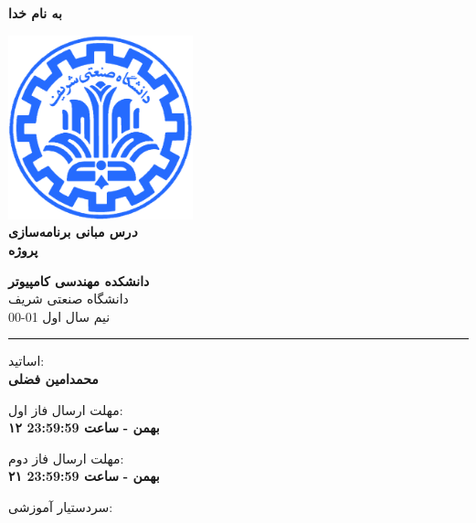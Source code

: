\documentclass[]{article}
\begin{document}
\begin{titlepage}
\begin{center}

\textbf{ \Huge{به نام خدا} }
        
\vspace{0.2cm}

\includegraphics[width=0.4\textwidth]{sharif1.png}\\
\vspace{0.2cm}
\textbf{ \Huge{\emph درس مبانی برنامه‌سازی } }\\
\vspace{0.25cm}
\textbf{ \Large{ پروژه} }
\vspace{0.2cm}
       
 
      \large \textbf{دانشکده مهندسی کامپیوتر}\\\vspace{0.1cm}
    \large   دانشگاه صنعتی شریف\\\vspace{0.2cm}
       \large   ﻧﯿﻢ سال اول 01-00 \\\vspace{0.10cm}
      \noindent\rule[1ex]{\linewidth}{1pt}
اساتید:\\
    \textbf{{محمدامین فضلی }}



    \vspace{0.20cm}

   مهلت ارسال فاز اول:\\
    \textbf{{۱۲ بهمن - }}
    \textbf{{ساعت 23:59:59}}

    \vspace{0.10cm}
    
       مهلت ارسال فاز دوم:\\
    
    \textbf{{۲۱ بهمن - }}
    \textbf{{ساعت 23:59:59}}
    
    \vspace{0.10cm}
    
    سردستیار آموزشی:\\
    \textbf{}
    

\end{center}
\end{titlepage}
\end{document}
